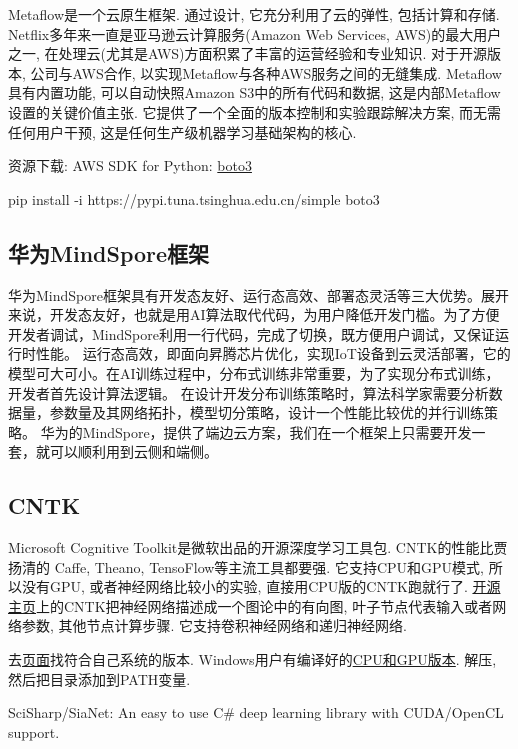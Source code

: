 Metaflow是一个云原生框架. 通过设计, 它充分利用了云的弹性, 包括计算和存储.
Netflix多年来一直是亚马逊云计算服务(Amazon Web Services, AWS)的最大用户之一, 在处理云(尤其是AWS)方面积累了丰富的运营经验和专业知识. 对于开源版本, 公司与AWS合作, 以实现Metaflow与各种AWS服务之间的无缝集成.
Metaflow具有内置功能, 可以自动快照Amazon S3中的所有代码和数据, 这是内部Metaflow设置的关键价值主张. 它提供了一个全面的版本控制和实验跟踪解决方案, 而无需任何用户干预, 这是任何生产级机器学习基础架构的核心.

\begin{remark}
资源下载: AWS SDK for Python: \href{https://github.com/boto/boto3}{boto3}

pip install -i https://pypi.tuna.tsinghua.edu.cn/simple boto3
\end{remark}
\subsection{华为MindSpore框架}
华为MindSpore框架具有开发态友好、运行态高效、部署态灵活等三大优势。展开来说，开发态友好，也就是用AI算法取代代码，为用户降低开发门槛。为了方便开发者调试，MindSpore利用一行代码，完成了切换，既方便用户调试，又保证运行时性能。
运行态高效，即面向昇腾芯片优化，实现IoT设备到云灵活部署，它的模型可大可小。在AI训练过程中，分布式训练非常重要，为了实现分布式训练，开发者首先设计算法逻辑。
在设计开发分布训练策略时，算法科学家需要分析数据量，参数量及其网络拓扑，模型切分策略，设计一个性能比较优的并行训练策略。
华为的MindSpore，提供了端边云方案，我们在一个框架上只需要开发一套，就可以顺利用到云侧和端侧。
\subsection{CNTK}
Microsoft Cognitive Toolkit是微软出品的开源深度学习工具包.
CNTK的性能比贾扬清的 Caffe, Theano, TensoFlow等主流工具都要强. 它支持CPU和GPU模式, 所以没有GPU, 或者神经网络比较小的实验, 直接用CPU版的CNTK跑就行了. \href{https://github.com/Microsoft/CNTK}{开源主页}上的CNTK把神经网络描述成一个图论中的有向图, 叶子节点代表输入或者网络参数, 其他节点计算步骤. 它支持卷积神经网络和递归神经网络. 

去\href{https://github.com/Microsoft/CNTK/wiki/CNTK-Binary-Download-and-Configuration}{页面}找符合自己系统的版本.
Windows用户有编译好的\href{https://cntk.ai/nightly-windows.html}{CPU和GPU版本}. 解压, 然后把目录添加到PATH变量.

SciSharp/SiaNet: An easy to use C\# deep learning library with CUDA/OpenCL support.

